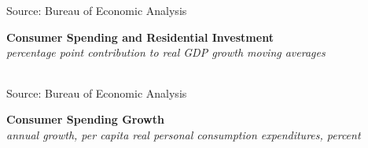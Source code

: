 \documentclass{report}
\makeatletter
\newcommand{\tbllink}[1]{\href{https://raw.githubusercontent.com/bdecon/US-chartbook/master/chartbook/data/#1}{\faTable}}
\newcommand*\short[1]{\expandafter\@gobbletwo\number\numexpr#1\relax}
\newcommand{\dateaxisticks}{
		date coordinates in=x, axis line style={draw=none},
		xmax={2023-11-01},
		max space between ticks=40,	    
		xtick={{1990-01-01}, {1992-01-01}, {1994-01-01}, 
			{1996-01-01}, {1998-01-01}, {2000-01-01}, 
			{2002-01-01}, {2004-01-01}, {2006-01-01},
			{2008-01-01}, {2010-01-01}, {2012-01-01}, {2014-01-01},
		    {2016-01-01}, {2018-01-01}, {2020-01-01}, {2022-01-01}, 
		    {2024-01-01}, {2026-01-01}},
		minor xtick={{1989-01-01}, {1991-01-01}, {1993-01-01},
			{1995-01-01}, {1997-01-01}, {1999-01-01}, 
			{2001-01-01}, {2003-01-01}, {2005-01-01}, {2007-01-01},
		    {2009-01-01}, {2011-01-01}, {2013-01-01}, {2015-01-01},
		    {2017-01-01}, {2019-01-01}, {2021-01-01}, {2023-01-01}, 
		    {2025-01-01}, {2027-01-01}},
		enlarge y limits={0.06}, enlarge x limits={0.01},
		}
\newcommand{\bbar}[2]{extra #1 ticks = {{#2}}, extra #1 tick labels = ,
		extra #1 tick style = {grid=major, grid style={thick, black!25}},}
\newcommand{\stdline}[4]{\addplot[very thick, no markers, color=#1] 
		table [x=#2, y=#3, col sep=comma] {#4};	}
\newcommand{\rbars}{
		\fill[color=black!10] (axis cs:{1990-07-01},\pgfkeysvalueof{/pgfplots/ymin}) rectangle 
			(axis cs:{1991-03-01}, \pgfkeysvalueof{/pgfplots/ymax});
		\fill[color=black!10] (axis cs:{2007-12-01},\pgfkeysvalueof{/pgfplots/ymin}) rectangle 
			(axis cs:{2009-07-01}, \pgfkeysvalueof{/pgfplots/ymax});
		\fill[color=black!10] (axis cs:{2001-03-01},\pgfkeysvalueof{/pgfplots/ymin}) rectangle 
			(axis cs:{2001-11-01}, \pgfkeysvalueof{/pgfplots/ymax});
		\fill[color=black!10] (axis cs:{2020-02-01},\pgfkeysvalueof{/pgfplots/ymin}) rectangle 
			(axis cs:{2020-05-01}, \pgfkeysvalueof{/pgfplots/ymax});}
\makeatother
\begin{document}
{\begin{minipage}{0.76\textwidth}
\footnotesize{Source: Bureau of Economic Analysis} \hfill \tbllink{pce_ma.csv}
\vspace{2mm}

\small  
\end{minipage}
\vspace{1mm}

\begin{minipage}{0.80\textwidth}
\normalsize \textbf{Consumer Spending and Residential Investment}\\
\footnotesize{\textit{percentage point contribution to real GDP growth \hspace{34mm} moving averages}}\\
 \setlength{\tabcolsep}{3.6pt} \color{black!90}
	{\renewcommand{\arraystretch}{1.56}
\hspace*{-2mm} \begin{tabular}{p{2.0mm} p{40mm} R{8.2mm} R{8.2mm} R{8.2mm} R{8.2mm} 
					R{7.2mm} R{7.2mm} R{7.2mm}}
		 \hline
	\end{tabular}}
	\vspace{-2mm}
	
\footnotesize{Source: Bureau of Economic Analysis}
\end{minipage}
\newpage 
\vspace*{-9mm}

\begin{minipage}{0.76\textwidth}  
\small 
\vspace{1mm}

\normalsize \textbf{Consumer Spending Growth}\\
\footnotesize{\textit{annual growth, per capita real personal consumption expenditures, percent}}
\vspace{4.6cm}

\hspace{3mm} 


\end{minipage}}
\end{document}
